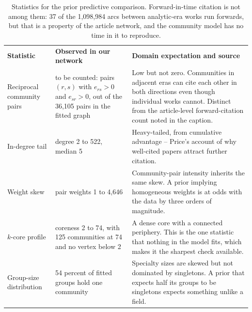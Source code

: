 \documentclass[11pt]{article}
\newcommand{\doublerule}{%
  \specialrule{0.5pt}{-1pt}{1pt}%
  \specialrule{0.5pt}{0pt}{1pt}}
\begin{document}
\begin{table}[!t]
\centering
\setlength{\tabcolsep}{4.5pt}
\caption{Statistics for the prior predictive comparison. Forward-in-time
  citation is not among them: 37 of the 1{,}098{,}984 arcs between
  analytic-era works run forwards, but that is a property of the article
  network, and the community model has no time in it to reproduce.}
\label{tab:stats}
\begin{tabular}{@{}P{3.1cm}P{4.6cm}P{6.4cm}@{}}
\toprule
\textbf{Statistic} & \textbf{Observed in our network}
  & \textbf{Domain expectation and source}\\
\doublerule
Reciprocal community pairs
  & to be counted: pairs $(r,s)$ with $e_{rs} > 0$ and $e_{sr} > 0$, out of the
    36{,}105 pairs in the fitted graph
  & Low but not zero. Communities in adjacent eras can cite each other in both
    directions even though individual works cannot. Distinct from the
    article-level forward-citation count noted in the caption.\\
In-degree tail
  & degree 2 to 522, median 5
  & Heavy-tailed, from cumulative advantage -- Price's account of why
    well-cited papers attract further citation.\\
Weight skew
  & pair weights 1 to 4{,}646
  & Community-pair intensity inherits the same skew. A prior implying
    homogeneous weights is at odds with the data by three orders of
    magnitude.\\
$k$-core profile
  & coreness 2 to 74, with 125 communities at 74 and no vertex below 2
  & A dense core with a connected periphery. This is the one statistic that
    nothing in the model fits, which makes it the sharpest check available.\\
Group-size distribution
  & 54 percent of fitted groups hold one community
  & Specialty sizes are skewed but not dominated by singletons. A prior that
    expects half its groups to be singletons expects something unlike a
    field.\\
\bottomrule
\end{tabular}
\end{table}
\end{document}
